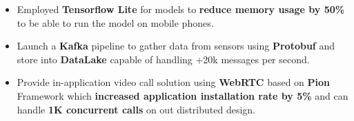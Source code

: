 \begin{itemize}
      \item Employed \textbf{Tensorflow Lite} for models to \textbf{reduce memory usage by 50\%} to be able to run the model on mobile phones.
      \item Launch a \textbf{Kafka} pipeline to gather data from sensors using \textbf{Protobuf} and store into \textbf{DataLake} capable of handling +20k messages per second.
      \item Provide in-application video call solution using \textbf{WebRTC} based on \textbf{Pion} Framework which \textbf{increased application installation rate by 5\%} and can handle \textbf{1K concurrent calls} on out distributed design.
\end{itemize}
